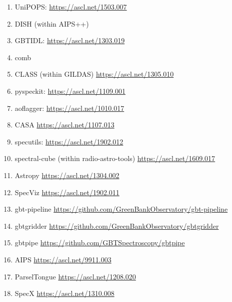 \documentclass[12pt,a4paper]{article}
\begin{document}
\begin{enumerate}
\item UniPOPS: \url{https://ascl.net/1503.007}
\item DISH (within AIPS++)
\item GBTIDL: \url{https://ascl.net/1303.019}
\item comb
\item CLASS (within GILDAS) \url{https://ascl.net/1305.010}
\item pyspeckit: \url{https://ascl.net/1109.001}
\item aoflagger: \url{https://ascl.net/1010.017}
\item CASA \url{https://ascl.net/1107.013}
\item specutils: \url{https://ascl.net/1902.012}
\item spectral-cube (within radio-astro-tools) \url{https://ascl.net/1609.017}
\item Astropy \url{https://ascl.net/1304.002}
\item SpecViz \url{https://ascl.net/1902.011}
\item gbt-pipeline \url{https://github.com/GreenBankObservatory/gbt-pipeline}
\item gbtgridder \url{https://github.com/GreenBankObservatory/gbtgridder}
\item gbtpipe \url{https://github.com/GBTSpectroscopy/gbtpipe}
\item AIPS \url{https://ascl.net/9911.003}
\item ParselTongue \url{https://ascl.net/1208.020}
\item SpecX \url{https://ascl.net/1310.008}
\end{enumerate}



\end{document}
